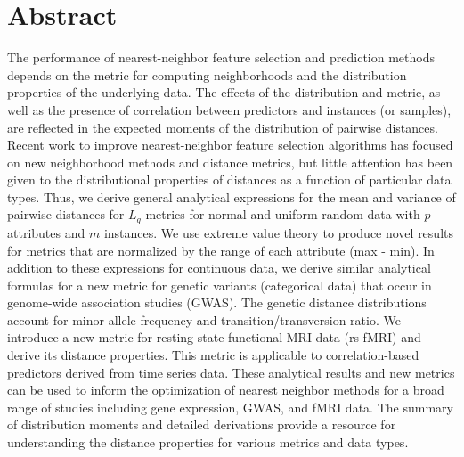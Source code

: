 \documentclass[10pt,letterpaper]{article}
\begin{document}
\section*{Abstract}
	The performance of nearest-neighbor feature selection and prediction methods depends on the metric for computing neighborhoods and the distribution properties of the underlying data. The effects of the distribution and metric, as well as the presence of correlation between predictors and instances (or samples), are reflected in the expected moments of the distribution of pairwise distances. Recent work to improve nearest-neighbor feature selection algorithms has focused on new neighborhood methods and distance metrics, but little attention has been given to the distributional properties of distances as a function of particular data types. Thus, we derive general analytical expressions for the mean and variance of pairwise distances for $L_q$ metrics for normal and uniform random data with $p$ attributes and $m$ instances. We use extreme value theory to produce novel results for metrics that are normalized by the range of each attribute (max - min). In addition to these expressions for continuous data, we derive similar analytical formulas for a new metric for genetic variants (categorical data) that occur in genome-wide association studies (GWAS). The genetic distance distributions account for minor allele frequency and transition/transversion ratio. We introduce a new metric for resting-state functional MRI data (rs-fMRI) and derive its distance properties. This metric is applicable to correlation-based predictors derived from time series data. These analytical results and new metrics can be used to inform the optimization of nearest neighbor methods for a broad range of studies including gene expression, GWAS, and fMRI data. The summary of distribution moments and detailed derivations provide a resource for understanding the distance properties for various metrics and data types.


\end{document}
